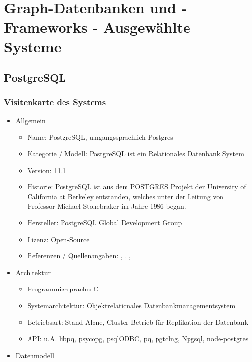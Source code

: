 \chapter{Graph-Datenbanken und -Frameworks - Ausgewählte Systeme }
\section{PostgreSQL}
\subsection{Visitenkarte des Systems}
    \begin{itemize}
        \item Allgemein
        \begin{itemize}
            \item Name: PostgreSQL, umgangssprachlich Postgres
            \item Kategorie / Modell: PostgreSQL ist ein Relationales Datenbank System
            \item Version: 11.1
            \item Historie: PostgreSQL ist aus dem POSTGRES Projekt der University of California at Berkeley entstanden, welches unter der Leitung von  Professor Michael Stonebraker im Jahre 1986 began.
            \item Hersteller: PostgreSQL Global Development Group
            \item Lizenz: Open-Source
            \item Referenzen / Quellenangaben: \cite{froehlich01}, \cite{postgres2018}, \cite{postgresqldoc}, \cite{eisentraut01}
        \end{itemize}
        \item Architektur
        \begin{itemize}
            \item Programmiersprache: C
            \item Systemarchitektur: Objektrelationales Datenbankmanagementsystem
            \item Betriebsart: Stand Alone, Cluster Betrieb für Replikation der Datenbank
            \item \ac{API}: u.A. libpq, psycopg, psqlODBC, pq, pgtclng, Npgsql, node-postgres
        \end{itemize}
        \newpage
        \item Datenmodell

\end{itemize}
